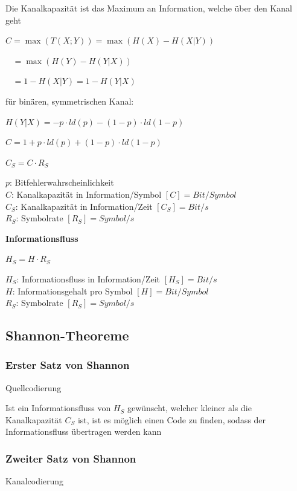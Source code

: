 Die Kanalkapazität ist das Maximum an Information, welche über den Kanal geht

$\displaystyle{
    C = \max(T(X;Y)) = \max(H(X) - H(X|Y))
}$

$\displaystyle{
\;\;\;= \max(H(Y) - H(Y|X))
}$

$\displaystyle{
\;\;\;= 1 - H(X|Y) = 1 - H(Y|X)
}$

für binären, symmetrischen Kanal:

$\displaystyle{
    H(Y|X) = -p \cdot ld(p) - (1 - p) \cdot ld(1 - p)
}$

$\displaystyle{
    C = 1 + p \cdot ld(p) + (1 - p) \cdot ld(1 - p)
}$

$\displaystyle{
    C_S = C \cdot R_S
}$

$p$: Bitfehlerwahrscheinlichkeit\\
$C$: Kanalkapazität in Information/Symbol $[C] = Bit/Symbol$\\
$C_S$: Kanalkapazität in Information/Zeit $[C_S] = Bit/s$\\
$R_S$: Symbolrate $[R_S] = Symbol/s$

\textbf{Informationsfluss}

$\displaystyle{
    H_S = H \cdot R_S
}$

$H_S$: Informationsfluss in Information/Zeit $[H_S] = Bit/s$\\
$H$: Informationsgehalt pro Symbol $[H] = Bit/Symbol$\\
$R_S$: Symbolrate $[R_S] = Symbol/s$

\subsection{Shannon-Theoreme}

\subsubsection{Erster Satz von Shannon}

Quellcodierung

Ist ein Informationsfluss von $H_S$ gewünscht, welcher kleiner als die Kanalkapazität $C_S$ ist,
ist es möglich einen Code zu finden, sodass der Informationsfluss übertragen werden kann

\subsubsection{Zweiter Satz von Shannon}

Kanalcodierung


